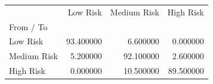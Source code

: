 \begin{tabular}{lrrr}
\toprule
 & Low Risk & Medium Risk & High Risk \\
From / To &  &  &  \\
\midrule
Low Risk & 93.400000 & 6.600000 & 0.000000 \\
Medium Risk & 5.200000 & 92.100000 & 2.600000 \\
High Risk & 0.000000 & 10.500000 & 89.500000 \\
\bottomrule
\end{tabular}
